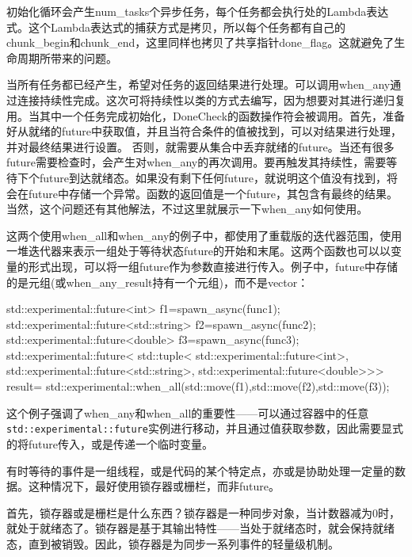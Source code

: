 初始化循环会产生num\_tasks个异步任务，每个任务都会执行处的Lambda表达式。这个Lambda表达式的捕获方式是拷贝，所以每个任务都有自己的chunk\_begin和chunk\_end，这里同样也拷贝了共享指针done\_flag。这就避免了生命周期所带来的问题。

当所有任务都已经产生，希望对任务的返回结果进行处理。可以调用when\_any通过连接持续性完成。这次可将持续性以类的方式去编写，因为想要对其进行递归复用。当其中一个任务完成初始化，DoneCheck的函数操作符会被调用。首先，准备好从就绪的future中获取值，并且当符合条件的值被找到，可以对结果进行处理，并对最终结果进行设置。 否则，就需要从集合中丢弃就绪的future。当还有很多future需要检查时，会产生对when\_any的再次调用。要再触发其持续性，需要等待下个future到达就绪态。如果没有剩下任何future，就说明这个值没有找到，将会在future中存储一个异常。函数的返回值是一个future，其包含有最终的结果。当然，这个问题还有其他解法，不过这里就展示一下when\_any如何使用。

这两个使用when\_all和when\_any的例子中，都使用了重载版的迭代器范围，使用一堆迭代器来表示一组处于等待状态future的开始和末尾。这两个函数也可以以变量的形式出现，可以将一组future作为参数直接进行传入。例子中，future中存储的是元组(或when\_any\_result持有一个元组)，而不是vector：

\begin{cpp}
std::experimental::future<int> f1=spawn_async(func1);
std::experimental::future<std::string> f2=spawn_async(func2);
std::experimental::future<double> f3=spawn_async(func3);
std::experimental::future<
  std::tuple<
    std::experimental::future<int>,
    std::experimental::future<std::string>,
    std::experimental::future<double>>> result=
  std::experimental::when_all(std::move(f1),std::move(f2),std::move(f3));
\end{cpp}

这个例子强调了when\_any和when\_all的重要性——可以通过容器中的任意\texttt{std::experimental::future}实例进行移动，并且通过值获取参数，因此需要显式的将future传入，或是传递一个临时变量。

有时等待的事件是一组线程，或是代码的某个特定点，亦或是协助处理一定量的数据。这种情况下，最好使用锁存器或栅栏，而非future。


首先，锁存器或是栅栏是什么东西？锁存器是一种同步对象，当计数器减为0时，就处于就绪态了。锁存器是基于其输出特性——当处于就绪态时，就会保持就绪态，直到被销毁。因此，锁存器是为同步一系列事件的轻量级机制。

